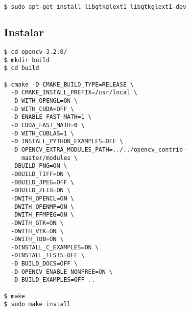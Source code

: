\begin{lstlisting}[language=bash]
$ sudo apt-get install libgtkglext1 libgtkglext1-dev
\end{lstlisting}
\newpage
\subsection*{Instalar}

\begin{lstlisting}
$ cd opencv-3.2.0/
$ mkdir build
$ cd build
	
$ cmake -D CMAKE_BUILD_TYPE=RELEASE \
  -D CMAKE_INSTALL_PREFIX=/usr/local \
  -D WITH_OPENGL=ON \
  -D WITH_CUDA=OFF \
  -D ENABLE_FAST_MATH=1 \
  -D CUDA_FAST_MATH=0 \
  -D WITH_CUBLAS=1 \
  -D INSTALL_PYTHON_EXAMPLES=OFF \
  -D OPENCV_EXTRA_MODULES_PATH=../../opencv_contrib-
     master/modules \
  -DBUILD_PNG=ON \
  -DBUILD_TIFF=ON \
  -DBUILD_JPEG=OFF \
  -DBUILD_ZLIB=ON \
  -DWITH_OPENCL=ON \
  -DWITH_OPENMP=ON \
  -DWITH_FFMPEG=ON \
  -DWITH_GTK=ON \
  -DWITH_VTK=ON \
  -DWITH_TBB=ON \
  -DINSTALL_C_EXAMPLES=ON \
  -DINSTALL_TESTS=OFF \
  -D BUILD_DOCS=OFF \
  -D OPENCV_ENABLE_NONFREE=ON \
  -D BUILD_EXAMPLES=OFF ..
	
$ make
$ sudo make install
\end{lstlisting} 


